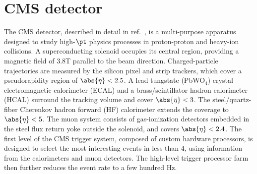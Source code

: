\section{CMS detector}

The CMS detector, described in detail in ref.~\cite{CMSdetector}, is a multi-purpose apparatus designed to study high-$\pt$ physics processes in proton-proton and heavy-ion collisions.  
A superconducting solenoid occupies its central 
region, providing a magnetic field of 3.8\unit{T} parallel to the beam direction. Charged-particle trajectories are measured by the silicon pixel and strip trackers, which 
cover a pseudorapidity region of $\abs{\eta} < 2.5$. A lead tungstate (PbWO$_4$) crystal electromagnetic calorimeter (ECAL) and a brass/scintillator hadron calorimeter (HCAL) 
surround the tracking volume and cover $\abs{\eta} < 3$. The steel/quartz-fiber Cherenkov hadron forward (HF) calorimeter extends the coverage to $\abs{\eta} < 5$.  
The muon system consists of gas-ionization detectors embedded in the steel flux return yoke outside the solenoid, and covers $\abs{\eta} < 2.4$. The first level of the 
CMS trigger system, composed of custom hardware processors, is designed to select the most interesting events in less than 4\mus, using information from the calorimeters 
and muon detectors. The high-level trigger processor farm then further reduces the event rate to a few hundred Hz.
